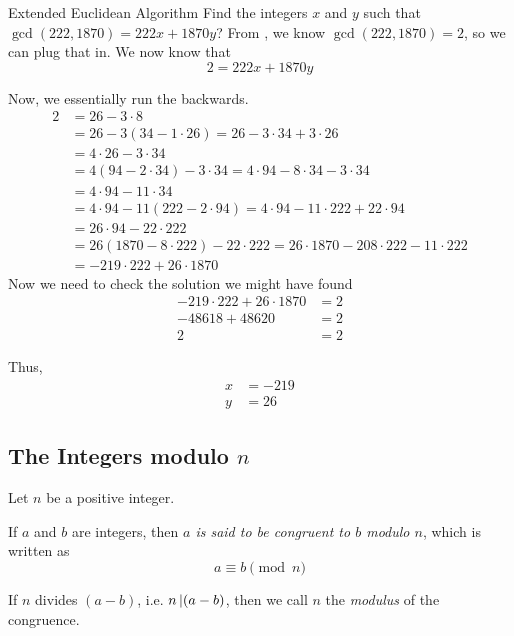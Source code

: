 \begin{example}{Extended Euclidean Algorithm}
  Find the integers $x$ and $y$ such that $\gcd(222, 1870) = 222x + 1870y$?
  \tcblower{}
  From , we know $\gcd(222, 1870) = 2$, so we can plug that in.
  We now know that
  \begin{equation*}
    2 = 222x + 1870y
  \end{equation*}

  Now, we essentially run the  backwards.
  \begin{align*}
    2 &= 26 - 3 \cdot 8 \\
      &= 26 - 3(34 - 1 \cdot 26) = 26 - 3 \cdot 34 + 3 \cdot 26 \\
      &= 4 \cdot 26 - 3 \cdot 34 \\
      &= 4(94 - 2 \cdot 34) - 3 \cdot 34 = 4 \cdot 94 - 8 \cdot 34 - 3 \cdot 34\\
      &= 4 \cdot 94 - 11 \cdot 34 \\
      &= 4 \cdot 94 - 11(222 - 2 \cdot 94) = 4 \cdot 94 - 11 \cdot 222 + 22 \cdot 94 \\
      &= 26 \cdot 94 - 22 \cdot 222 \\
      &= 26(1870 - 8 \cdot 222) - 22 \cdot 222 = 26 \cdot 1870 - 208 \cdot 222 - 11 \cdot 222 \\
      &= -219 \cdot 222 + 26 \cdot 1870
  \end{align*}
  Now we need to check the solution we might have found
  \begin{align*}
    -219 \cdot 222 + 26 \cdot 1870 &= 2 \\
    -48618 + 48620 &= 2 \\
    2 &= 2
  \end{align*}

  Thus,
  \begin{align*}
    x &= -219 \\
    y &= 26
  \end{align*}
\end{example}

\subsection{\texorpdfstring{The Integers modulo $n$}{The Integers modulo n}}\label{subsec:Integer_Modulo_n}
Let $n$ be a positive integer.
\begin{definition}[Congruence]\label{def:Congruence}
  If $a$ and $b$ are integers, then \emph{$a$ is said to be congruent to $b$ modulo $n$}, which is written as
  \begin{equation}\label{eq:A_Congruent_B}
    a \equiv b \pmod{n}
  \end{equation}

  If $n$ divides $(a-b)$, i.e. $n \operatorname{\vert} (a-b)$, then we call $n$ the \emph{modulus} of the congruence.

\end{definition}

